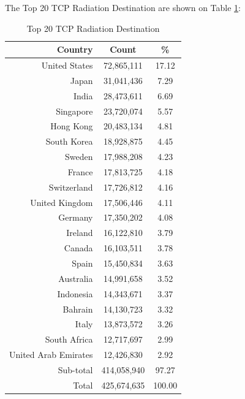 \newpage
The Top 20 TCP Radiation Destination are shown on Table \ref{tab:top20tcpradiationdestination}:
\begin{table}[!h]
\begin{center}
\caption{Top 20 TCP Radiation Destination}
\label{tab:top20tcpradiationdestination}
\begin{tabular}{ |r|c|c| }
\hline
\centering Country & Count & \%  \\
\hline
United States & 72,865,111 & 17.12  \\
Japan & 31,041,436 & 7.29  \\
India & 28,473,611 & 6.69  \\
Singapore & 23,720,074 & 5.57  \\
Hong Kong & 20,483,134 & 4.81  \\
South Korea & 18,928,875 & 4.45  \\
Sweden & 17,988,208 & 4.23  \\
France & 17,813,725 & 4.18  \\
Switzerland & 17,726,812 & 4.16  \\
United Kingdom & 17,506,446 & 4.11  \\
Germany & 17,350,202 & 4.08  \\
Ireland & 16,122,810 & 3.79  \\
Canada & 16,103,511 & 3.78  \\
Spain & 15,450,834 & 3.63  \\
Australia & 14,991,658 & 3.52  \\
Indonesia & 14,343,671 & 3.37  \\
Bahrain & 14,130,723 & 3.32  \\
Italy & 13,873,572 & 3.26  \\
South Africa & 12,717,697 & 2.99  \\
United Arab Emirates & 12,426,830 & 2.92  \\
\hline
Sub-total & 414,058,940 & 97.27  \\
\hline
Total & 425,674,635 & 100.00  \\
\hline
\end{tabular}
\end{center}
\end{table}

